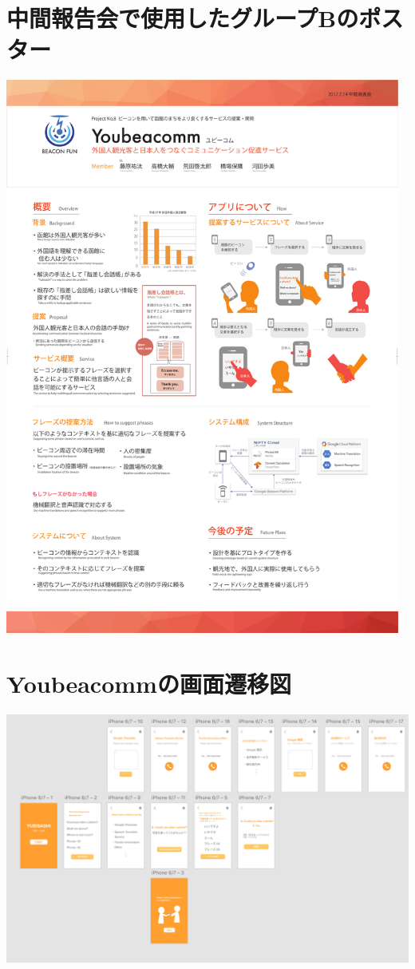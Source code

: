 \documentclass[12pt,papersize]{jsbook}
\begin{document}
\begin{appendix}

\chapter{中間報告会で使用したグループBのポスター}
\begin{center}
\includegraphics[width=13cm]{gbt.pdf}
\end{center}

\chapter{Youbeacommの画面遷移図}
\begin{center}
\includegraphics[width=20cm,angle=90]{moc.png}
\end{center}


\end{appendix}
\end{document}

